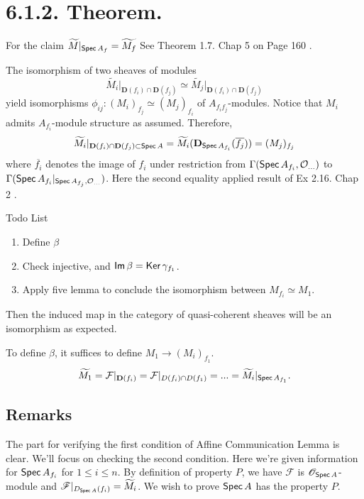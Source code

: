 \section{6.1.2. Theorem.}

For the claim $\widetilde{M}\vert_{\operatorname{\mathsf{Spec}} A_f}=\widetilde{M_f}$ See Theorem 1.7. Chap 5 on Page 160 \cite{qing2006algebraic}.

The isomorphism of two sheaves of modules 
\[\widetilde{M_i}\vert_{\mathbf D(f_i)\cap \mathbf D(f_j)}\simeq \widetilde{M_j}\vert_{\mathbf D(f_i)\cap \mathbf D(f_j)}\] yield isomorphisms $\phi_{ij}: (M_i)_{f_j}\simeq (M_j)_{f_i}$ of $A_{f_if_j}$-modules.
Notice that $M_i$ admits $A_{f_i}$-module structure as assumed. Therefore, 
\[\widetilde{M_i}\vert_{\mathbf D(f_i)\cap\mathbf D(f_j)\subset \operatorname{\mathsf{Spec}} A}=\widetilde{M_i}(\mathbf D_{\operatorname{\mathsf{Spec}} A_{f_i}}(\overline{f_j}))=(M_j)_{f_j}\] where $\overline{f_i}$ denotes the image of $f_i$ under restriction from $\Gamma(\operatorname{\mathsf{Spec}} A_{f_i},\mathcal O_{...})$ to $\Gamma(\operatorname{\mathsf{Spec}} A_{f_i}\vert_{\operatorname{\mathsf{Spec}} A_{f_j}, \mathcal O_{...}})$. 
Here the second equality applied result of Ex 2.16. Chap 2 \cite{hartshorne2013algebraic}.

Todo List \begin{enumerate}
    \item Define $\beta$
    \item Check injective, and $\operatorname{\mathsf{Im}} \beta=\operatorname{\mathsf{Ker}} \gamma_{f_1}$.
    \item Apply five lemma to conclude the isomorphism between $M_{f_i}\simeq M_1$.
\end{enumerate}Then the induced map in the category of quasi-coherent sheaves will be an isomorphism as expected. 

To define $\beta$, it suffices to define $M_1\to (M_i)_{f_1}$.
\begin{align*}
    \widetilde{M_1}=\mathcal F\vert_{\mathbf D(f_i)}=\mathcal F\vert_{D(f_i)\cap D(f_1)}=...=\widetilde{M_i}\vert_{\operatorname{\mathsf{Spec}} A_{f_1}}.
\end{align*}

\subsection{Remarks}

The part for verifying the first condition of Affine Communication Lemma is clear. We'll focus on checking the second condition. Here we're given information for $\operatorname{\mathsf{Spec}} A_{f_i}$ for $1\leq i\leq n$. By definition of  property $P$, we have $\mathscr F$ is $\mathscr O_{\operatorname{\mathsf{Spec}} A}$-module and $\mathscr F\vert_{D_{\operatorname{\mathsf{Spec}} A}(f_i)}=\widetilde{M_i}$. We wish to prove $\operatorname{\mathsf{Spec}} A$ has the property $P$. 

